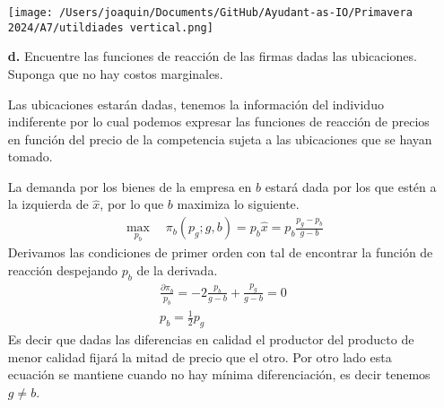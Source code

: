 \documentclass{exam}
\begin{document}
\begin{itemize}
    \begin{solution}
        \begin{center}
            \texttt{[image: /Users/joaquin/Documents/GitHub/Ayudant-as-IO/Primavera 2024/A7/utildiades vertical.png]}
        \end{center}
    \end{solution}
    \item[\textbf{d.}] Encuentre las funciones de reacción de las firmas dadas las ubicaciones. Suponga que no hay costos marginales. 
    \begin{solution}
        Las ubicaciones estarán dadas, tenemos la información del individuo indiferente por lo cual podemos expresar las funciones de reacción de precios en función del precio de la competencia sujeta a las ubicaciones que se hayan tomado. \vspace{3mm}

        La demanda por los bienes de la empresa en $b$ estará dada por los que estén a la izquierda de $\hat{x}$, por lo que $b$ maximiza lo siguiente.
        \begin{align*}
            \max_{p_b} \quad \pi_b(p_g;g,b) = p_b \hat{x} = p_b\frac{p_g-p_b}{g-b}
        \end{align*}
        Derivamos las condiciones de primer orden con tal de encontrar la función de reacción despejando $p_b$ de la derivada.
        \begin{align*}
            \frac{\partial \pi_b}{p_b} = - 2\frac{p_b}{g-b} + \frac{p_g}{g-b} = 0 \\
            \boxed{p_b = \frac{1}{2}p_g} 
        \end{align*}
        Es decir que dadas las diferencias en calidad el productor del producto de menor calidad fijará la mitad de precio que el otro. Por otro lado esta ecuación se mantiene cuando no hay mínima diferenciación, es decir tenemos $g\neq b$. 


\end{solution}
\end{itemize}
\end{document}

